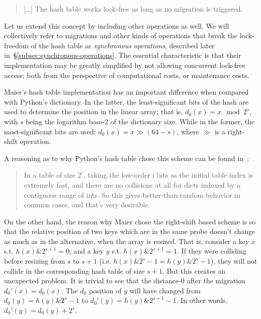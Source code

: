 \begin{quote}
	[\ldots] The hash table works lock-free as long as no migration is triggered.
\end{quote}

Let us extend this concept by including other operations as well.
We will collectively refer to migrations and other kinds of operations that break the lock-freedom of the hash table as \emph{synchronous operations}, described later in~\S\ref{subsec:synchronous-operations}.
The essential characteristic is that their implementation may be greatly simplified by not allowing concurrent lock-free access; both from the perspective of computational costs, or maintenance costs.

Maier's hash table implementation has an important difference when compared with Python's dictionary.
In the latter, the least-significant bits of the hash are used to determine the position in the linear array; that is, $d_0(x) = x \mod 2^s$, with $s$ being the logarithm base-2 of the dictionary size.
While in the former, the most-significant bits are used: $d_0(x) = x \gg (64 - s)$, where $\gg$ is a right-shift operation.

A reasoning as to why Python's hash table chose this scheme can be found in~\cite{dict-comment-hash}:
\begin{quote}
	In a table of size $2^i$, taking the low-order i bits as the initial table index is extremely fast, and there
	are no collisions at all for dicts indexed by a contiguous range of ints.
	So this gives better-than-random behavior in common cases, and that's very desirable.
\end{quote}
On the other hand, the reason why Maier chose the right-shift based scheme is so that the relative position of two keys which are in the same probe doesn't change as much as in the alternative, when the array is resized.
That is, consider a key $x$ s.t. $h(x) \mathbin{\&} 2^{s + 1} = 0$, and a key $y$ s.t. $h(x) \mathbin{\&} 2^{s + 1} = 1$.
If they were colliding before resizing from $s$ to $s + 1$ (i.e. $h(x) \mathbin{\&} 2^s - 1 = h(y) \mathbin{\&} 2^s - 1$), they will not collide in the corresponding hash table of size $s + 1$.
But this creates an unexpected problem.
It is trivial to see that the distance-0 after the migration $d_0'(x) = d_0(x)$.
The $d_0$ position of $y$ will have changed from $d_0(y) = h(y) \mathbin{\&} 2^s-1$ to $d_0'(y) = h(y) \mathbin{\&} 2^{s+1}-1$.
In other words, $d_0'(y) = d_0(y) + 2^s$.


